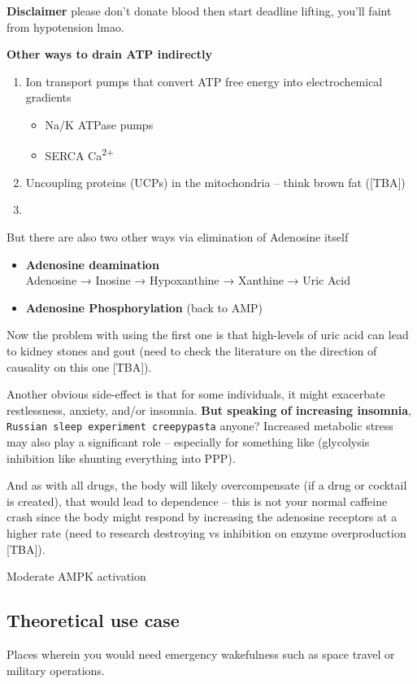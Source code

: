 \documentclass[11.5pt]{report}
\begin{document}
\noindent \textbf{Disclaimer} please don't donate blood then start deadline lifting, you'll faint from hypotension lmao. 

\noindent \textbf{Other ways to drain ATP indirectly}
\begin{enumerate}
	\item Ion transport pumps that convert ATP free energy into electrochemical gradients
		\begin{itemize}
			\item Na/K ATPase pumps
			\item SERCA Ca\textsuperscript{2+} 
		\end{itemize}
	\item Uncoupling proteins (UCPs) in the mitochondria -- think brown fat ([TBA])
	\item 
\end{enumerate}




\noindent But there are also two other ways via elimination of Adenosine itself 
\begin{itemize}
	\item \textbf{Adenosine deamination} \\
	Adenosine → Inosine → Hypoxanthine → Xanthine → Uric Acid 
	\item \textbf{Adenosine Phosphorylation} (back to AMP)
\end{itemize}
Now the problem with using the first one is that high-levels of uric acid can lead to kidney stones and gout (need to check the literature on the direction of causality on this one [TBA]).


\noindent Another obvious side-effect is that for some individuals, it might exacerbate restlessness, anxiety, and/or insomnia. \textbf{But speaking of increasing insomnia}, \texttt{Russian sleep experiment creepypasta} anyone? Increased metabolic stress may also play a significant role -- especially for something like (glycolysis inhibition like shunting everything into PPP). 

\noindent And as with all drugs, the body will likely overcompensate (if a drug or cocktail is created), that would lead to dependence -- this is not your normal caffeine crash since the body might respond by increasing the adenosine receptors at a higher rate (need to research destroying vs inhibition on enzyme overproduction [TBA]). 

\noindent Moderate AMPK activation

\subsection{Theoretical use case}
Places wherein you would need emergency wakefulness such as space travel or military operations. 
\end{document}
